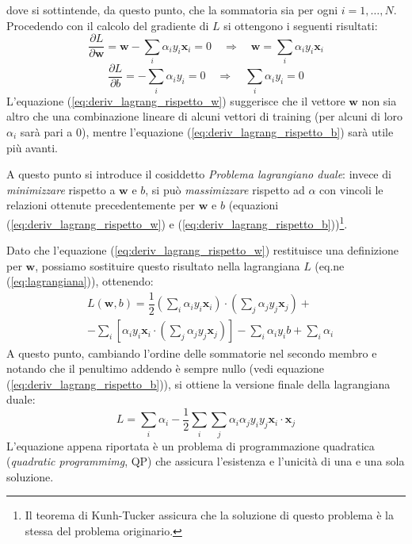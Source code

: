 dove si sottintende, da questo punto, che la sommatoria sia per ogni $i=1,\ldots,N$.
\\
Procedendo con il calcolo del gradiente di $L$ si ottengono i seguenti risultati:
\begin{equation}
\label{eq:deriv_lagrang_rispetto_w}
\dfrac{\partial L}{\partial \mathbf{w}}=\mathbf{w}-\sum_i\alpha_i y_i\mathbf{x}_i=0 \quad\Rightarrow\quad \mathbf{w}=\sum_i\alpha_i y_i\mathbf{x}_i
\end{equation}
\begin{equation}
\label{eq:deriv_lagrang_rispetto_b}
\dfrac{\partial L}{\partial b}=-\sum_i\alpha_iy_i=0 \quad\Rightarrow\quad \sum_i\alpha_iy_i=0
\end{equation}
L'equazione (\ref{eq:deriv_lagrang_rispetto_w}) suggerisce che il vettore $\mathbf{w}$ non sia altro che una combinazione lineare di alcuni vettori di training (per alcuni di loro $\alpha_i$ sarà pari a $0$), mentre l'equazione (\ref{eq:deriv_lagrang_rispetto_b}) sarà utile più avanti.

A questo punto si introduce il cosiddetto \textit{Problema lagrangiano duale}: invece di \emph{minimizzare} rispetto a $\mathbf{w}$ e $b$, si può \emph{massimizzare} rispetto ad $\alpha$ con vincoli le relazioni ottenute precedentemente per $\mathbf{w}$ e $b$ (equazioni (\ref{eq:deriv_lagrang_rispetto_w}) e (\ref{eq:deriv_lagrang_rispetto_b}))\footnote{Il teorema di Kunh-Tucker assicura che la soluzione di questo problema è la stessa del problema originario.}.

Dato che l'equazione (\ref{eq:deriv_lagrang_rispetto_w}) restituisce una definizione per $\mathbf{w}$, possiamo sostituire questo risultato nella lagrangiana $L$ (eq.ne (\ref{eq:lagrangiana})), ottenendo:
\begin{eqnarray}\nonumber
\label{eq:lagrangiana_finale1}
&L(\mathbf{w},b)	= \dfrac{1}{2}\left ( \sum_i \alpha_iy_i\mathbf{x}_i \right )\cdot\left (\sum_j\alpha_jy_j\mathbf{x}_j\right )+\\
		&-\sum_i\left [\alpha_iy_i\mathbf{x}_i\cdot\left (\sum_j\alpha_jy_j\mathbf{x}_j\right )\right ]-
		\sum_i\alpha_iy_ib+\sum_i\alpha_i	
\end{eqnarray}
A questo punto, cambiando l'ordine delle sommatorie nel secondo membro e notando che il penultimo addendo è sempre nullo (vedi equazione (\ref{eq:deriv_lagrang_rispetto_b})), si ottiene la versione finale della lagrangiana duale: 
\begin{equation}
\label{eq:langrangiana_finale2}
L=\sum_i\alpha_i-\dfrac{1}{2	}\sum_i\sum_j\alpha_i\alpha_jy_iy_j\mathbf{x}_i\cdot\mathbf{x}_j
\end{equation}
L'equazione appena riportata è un problema di programmazione quadratica (\emph{quadratic programmimg}, QP) che assicura l'esistenza e l'unicità di una e una sola soluzione.\\

